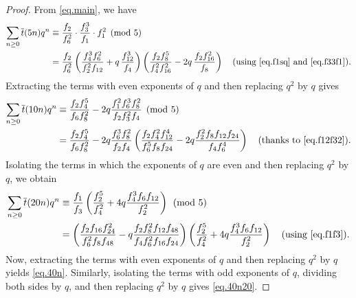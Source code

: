 \documentclass{amsart}
\theoremstyle{definition}
\newcommand{\tbar}{\overline{t}}
\begin{document}
\begin{proof}
From \eqref{eq.main}, we have 
\begin{align*}
    \sum_{n\ge0}\tbar(5n)q^{n}
&\equiv\frac{f_2}{f_6^{2}}\cdot\frac{f_3^{3}}{f_1}\cdot f_1^{2}\pmod 5\\
&=\frac{f_2}{f_6^{2}}\left(\frac{f_4^{3}f_6^{2}}{f_2^{2}f_{12}}+q\,\frac{f_{12}^{3}}{f_4}\right)\left(\frac{f_2f_8^{5}}{f_4^{2}f_{16}^{2}}-2q\,\frac{f_2f_{16}^{2}}{f_8}\right) \quad \text{(using \eqref{eq.f1sq} and \eqref{eq.f33f1})}.
\end{align*}
Extracting the terms with even exponents of $q$ and then replacing $q^2$ by $q$ gives
\begin{align*}
    \sum_{n\ge0}\tbar(10n)q^{n}&\equiv \frac{f_2f_4^{5}}{f_6f_8^{2}}
-2q\frac{f_1^{2}f_6^{3}f_8^{2}}{f_2f_3^{2}f_4}\pmod5\\
&=\frac{f_2f_4^{5}}{f_6f_8^{2}}-2q\frac{f_6^{3}f_8^{2}}{f_2f_4}\left(\frac{f_2f_4^{2}f_{12}^{4}}{f_6^{5}f_8f_{24}}
-2q\frac{f_2^{2}f_8f_{12}f_{24}}{f_4f_6^{4}}\right) \quad \text{(thanks to \eqref{eq.f12f32})}.
\end{align*}
Isolating the terms in which the exponents of $q$ are even and then replacing $q^2$ by $q$, we obtain
\begin{align*}
     \sum_{n\ge0}\tbar(20n)q^{n}&\equiv \frac{f_1}{f_3}\left(\frac{f_2^{5}}{f_4^{2}}+4q\frac{f_4^{3}f_6f_{12}}{f_2^{2}}\right)
\pmod5\\
&=\left(\frac{f_2f_{16}f_{24}^{2}}{f_6^{2}f_8f_{48}}
-q\frac{f_2f_8^{2}f_{12}f_{48}}{f_4f_6^{2}f_{16}f_{24}}\right) \left(\frac{f_2^{5}}{f_4^{2}}+4q\frac{f_4^{3}f_6f_{12}}{f_2^{2}}\right) \quad \text{(using \eqref{eq.f1f3})}.
\end{align*}
Now, extracting the terms with even exponents of $q$ and then replacing $q^2$ by $q$ yields \eqref{eq.40n}. Similarly, isolating the terms with odd exponents of $q$, dividing both sides by $q$, and then replacing $q^2$ by $q$ gives \eqref{eq.40n20}.
\end{proof}
\end{document}
